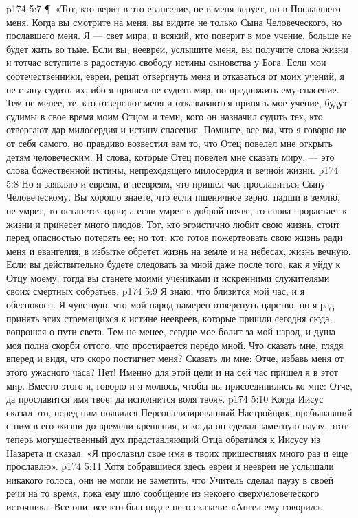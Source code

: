 \vs p174 5:7 \P\ «Тот, кто верит в это евангелие, не в меня верует, но в Пославшего меня. Когда вы смотрите на меня, вы видите не только Сына Человеческого, но пославшего меня. Я --- свет мира, и всякий, кто поверит в мое учение, больше не будет жить во тьме. Если вы, неевреи, услышите меня, вы получите слова жизни и тотчас вступите в радостную свободу истины сыновства у Бога. Если мои соотечественники, евреи, решат отвергнуть меня и отказаться от моих учений, я не стану судить их, ибо я пришел не судить мир, но предложить ему спасение. Тем не менее, те, кто отвергают меня и отказываются принять мое учение, будут судимы в свое время моим Отцом и теми, кого он назначил судить тех, кто отвергают дар милосердия и истину спасения. Помните, все вы, что я говорю не от себя самого, но правдиво возвестил вам то, что Отец повелел мне открыть детям человеческим. И слова, которые Отец повелел мне сказать миру, --- это слова божественной истины, непреходящего милосердия и вечной жизни.
\vs p174 5:8 Но я заявляю и евреям, и неевреям, что пришел час прославиться Сыну Человеческому. Вы хорошо знаете, что если пшеничное зерно, падши в землю, не умрет, то останется одно; а если умрет в доброй почве, то снова прорастает к жизни и принесет много плодов. Тот, кто эгоистично любит свою жизнь, стоит перед опасностью потерять ее; но тот, кто готов пожертвовать свою жизнь ради меня и евангелия, в избытке обретет жизнь на земле и на небесах, жизнь вечную. Если вы действительно будете следовать за мной даже после того, как я уйду к Отцу моему, тогда вы станете моими учениками и искренними служителями своих смертных собратьев.
\vs p174 5:9 Я знаю, что близится мой час, и я обеспокоен. Я чувствую, что мой народ намерен отвергнуть царство, но я рад принять этих стремящихся к истине неевреев, которые пришли сегодня сюда, вопрошая о пути света. Тем не менее, сердце мое болит за мой народ, и душа моя полна скорби оттого, что простирается передо мной. Что сказать мне, глядя вперед и видя, что скоро постигнет меня? Сказать ли мне: Отче, избавь меня от этого ужасного часа? Нет! Именно для этой цели и на сей час пришел я в этот мир. Вместо этого я, говорю и я молюсь, чтобы вы присоединились ко мне: Отче, да прославится имя твое; да исполнится воля твоя».
\vs p174 5:10 Когда Иисус сказал это, перед ним появился Персонализированный Настройщик, пребывавший с ним в его жизни до времени крещения, и когда он сделал заметную паузу, этот теперь могущественный дух представляющий Отца обратился к Иисусу из Назарета и сказал: «Я прославил свое имя в твоих пришествиях много раз и еще прославлю».
\vs p174 5:11 Хотя собравшиеся здесь евреи и неевреи не услышали никакого голоса, они не могли не заметить, что Учитель сделал паузу в своей речи на то время, пока ему шло сообщение из некоего сверхчеловеческого источника. Все они, все кто был подле него сказали: «Ангел ему говорил».
